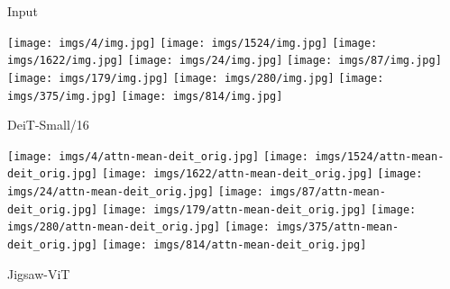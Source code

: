 \documentclass{article}
\begin{document}
\begin{figure*}[t]
		\centering
		\begin{minipage}{0.1\textwidth}
		\centering
		\footnotesize{Input}
		\end{minipage}\hfill
		\begin{minipage}{0.9\textwidth}
		\centering
		\texttt{[image: imgs/4/img.jpg]}
		\texttt{[image: imgs/1524/img.jpg]}
		\texttt{[image: imgs/1622/img.jpg]}
		\texttt{[image: imgs/24/img.jpg]}
		\texttt{[image: imgs/87/img.jpg]}
		\texttt{[image: imgs/179/img.jpg]}
		\texttt{[image: imgs/280/img.jpg]}
		\texttt{[image: imgs/375/img.jpg]}
		\texttt{[image: imgs/814/img.jpg]}
		\end{minipage}\hfill
\begin{minipage}{0.1\textwidth}
		\centering
		\footnotesize{DeiT-Small/16}
		\end{minipage}\hfill
		\begin{minipage}{0.9\textwidth}
		\centering
		\texttt{[image: imgs/4/attn-mean-deit\_orig.jpg]}
		\texttt{[image: imgs/1524/attn-mean-deit\_orig.jpg]}
		\texttt{[image: imgs/1622/attn-mean-deit\_orig.jpg]}
		\texttt{[image: imgs/24/attn-mean-deit\_orig.jpg]}
		\texttt{[image: imgs/87/attn-mean-deit\_orig.jpg]}
		\texttt{[image: imgs/179/attn-mean-deit\_orig.jpg]}
		\texttt{[image: imgs/280/attn-mean-deit\_orig.jpg]}
		\texttt{[image: imgs/375/attn-mean-deit\_orig.jpg]}
		\texttt{[image: imgs/814/attn-mean-deit\_orig.jpg]}
		\end{minipage}\hfill
\begin{minipage}{0.1\textwidth}
		\centering
		\footnotesize{Jigsaw-ViT}
		\end{minipage}\hfill
		\begin{minipage}{0.9\textwidth}

\end{minipage}
\end{figure*}
\end{document}
